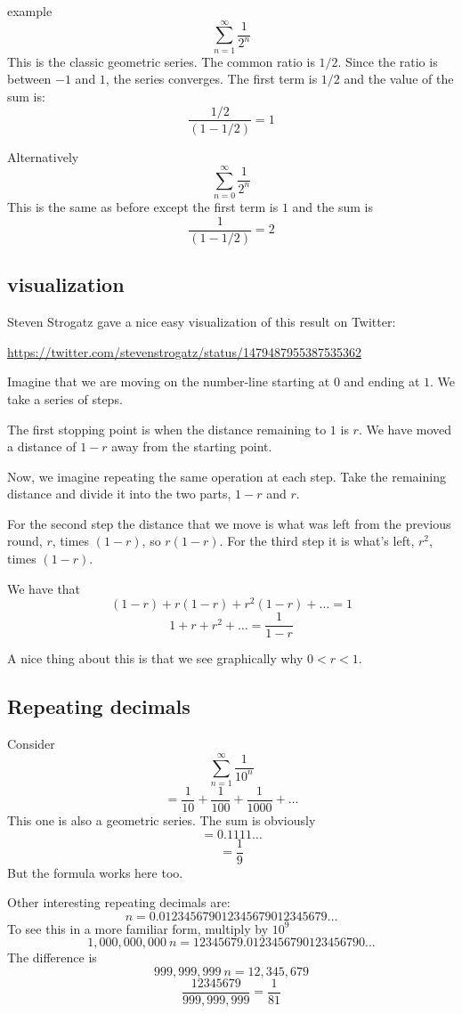 \documentclass[11pt, oneside]{article}
\begin{document}
example
\[  \sum_{n=1}^{\infty} \frac{1}{2^n} \]
This is the classic geometric series.  The common ratio is $1/2$.  Since the ratio is between $-1$ and $1$, the series converges.  The first term is $1/2$ and the value of the sum is:
\[ \frac{1/2}{(1 - 1/2)} = 1 \]

Alternatively
\[  \sum_{n=0}^{\infty} \frac{1}{2^n} \]
This is the same as before except the first term is $1$ and the sum is
\[    \frac{1}{(1 - 1/2)} = 2 \]

\subsection*{visualization}

Steven Strogatz gave a nice easy visualization of this result on Twitter:

\url{https://twitter.com/stevenstrogatz/status/1479487955387535362}

Imagine that we are moving on the number-line starting at $0$ and ending at $1$.  We take a series of steps.

The first stopping point is when the distance remaining to $1$ is $r$.  We have moved a distance of $1 - r$ away from the starting point.

Now, we imagine repeating the same operation at each step.  Take the remaining distance and divide it into the two parts, $1-r$ and $r$.  

For the second step the distance that we move is what was left from the previous round, $r$, times $(1-r)$, so $r(1-r)$.  For the third step it is what's left, $r^2$, times $(1-r)$.

We have that
\[ (1 - r) + r (1-r) + r^2 (1-r) + \dots = 1 \]
\[ 1 + r + r^2 + \dots = \frac{1}{1 - r} \]

A nice thing about this is that we see graphically why $0 < r < 1$.

\subsection*{Repeating decimals}
Consider
\[  \sum_{n=1}^{\infty} \frac{1}{10^n} \]
\[ = \frac{1}{10} + \frac{1}{100} + \frac{1}{1000} + \dots \]
This one is also a geometric series.  The sum is obviously
\[ = 0.1111 \dots \]
\[ = \frac{1}{9} \]
But the formula works here too.

Other interesting repeating decimals are:
\[ n = 0.012345679012345679012345679 \dots \]
To see this in a more familiar form, multiply by $10^9$
\[ 1,000,000,000 \ n = 12345679.0123456790123456790 \dots \]
The difference is 
\[ 999,999,999 \ n = 12,345,679 \]
\[ \frac{12345679}{999,999,999} = \frac{1}{81} \]
\end{document}
